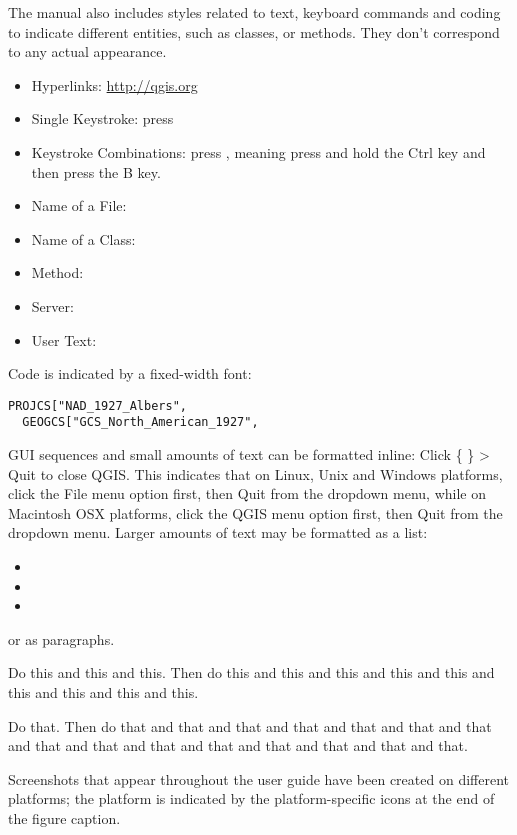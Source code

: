
The manual also includes styles related to text, keyboard commands and coding
to indicate different entities, such as classes, or methods. They don't
correspond to any actual appearance.

\begin{itemize}
%
\item Hyperlinks: \url{http://qgis.org}
%
\item Single Keystroke: press 
\item Keystroke Combinations: press , meaning press and
hold the Ctrl key and then press the B key.
\item Name of a File: 
\item Name of a Class: 
\item Method: 
\item Server: 
%
\item User Text: 
\end{itemize}

Code is indicated by a fixed-width font:
\begin{verbatim}
PROJCS["NAD_1927_Albers",
  GEOGCS["GCS_North_American_1927",
\end{verbatim}


GUI sequences and small amounts of text can be formatted inline: Click
\{\nix{} \} > Quit to close QGIS. This indicates that on
Linux, Unix and Windows platforms, click the File menu option first, then
Quit from the dropdown menu, while on Macintosh OSX platforms, click the QGIS
menu option first, then Quit from the dropdown menu. Larger amounts of text
may be formatted as a list:

\begin{itemize}
\item {} 
\item {} 
\item {}
\end{itemize}

or as paragraphs.

\nix{} \osx{} Do this and this and this. Then do this and this and this
and this and this and this and this and this and this.

\win{}Do that. Then do that and that and that and that and that and that and
that and that and that and that and that and that and that and that and that.

Screenshots that appear throughout the user guide have been created on
different platforms; the platform is indicated by the platform-specific icons
at the end of the figure caption.



